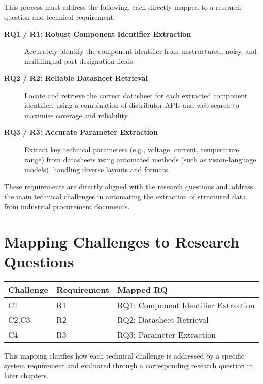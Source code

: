 This process must address the following, each directly mapped to a research question and technical requirement:

\begin{description}
  \item[\textbf{RQ1 / R1: Robust Component Identifier Extraction}] Accurately identify the component identifier from unstructured, noisy, and multilingual part designation fields.
  \item[\textbf{RQ2 / R2: Reliable Datasheet Retrieval}] Locate and retrieve the correct datasheet for each extracted component identifier, using a combination of distributor APIs and web search to maximise coverage and reliability.
  \item[\textbf{RQ3 / R3: Accurate Parameter Extraction}] Extract key technical parameters (e.g., voltage, current, temperature range) from datasheets using automated methods (such as vision-language models), handling diverse layouts and formats.
\end{description}

These requirements are directly aligned with the research questions and address the main technical challenges in automating the extraction of structured data from industrial procurement documents.



\section{Mapping Challenges to Research Questions}
\begin{center}
\begin{tabular}{lll}
\textbf{Challenge} & \textbf{Requirement} & \textbf{Mapped RQ} \\\hline
C1 & R1 & RQ1: Component Identifier Extraction \\
C2,C3 & R2 & RQ2: Datasheet Retrieval \\
C4 & R3 & RQ3: Parameter Extraction \\
\end{tabular}
\end{center}

This mapping clarifies how each technical challenge is addressed by a specific system requirement and evaluated through a corresponding research question in later chapters.
